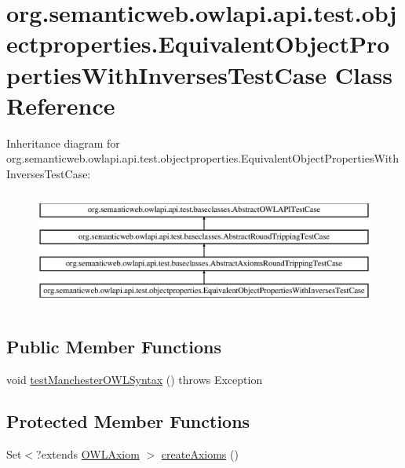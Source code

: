 \hypertarget{classorg_1_1semanticweb_1_1owlapi_1_1api_1_1test_1_1objectproperties_1_1_equivalent_object_properties_with_inverses_test_case}{\section{org.\-semanticweb.\-owlapi.\-api.\-test.\-objectproperties.\-Equivalent\-Object\-Properties\-With\-Inverses\-Test\-Case Class Reference}
\label{classorg_1_1semanticweb_1_1owlapi_1_1api_1_1test_1_1objectproperties_1_1_equivalent_object_properties_with_inverses_test_case}
}
Inheritance diagram for org.\-semanticweb.\-owlapi.\-api.\-test.\-objectproperties.\-Equivalent\-Object\-Properties\-With\-Inverses\-Test\-Case\-:\begin{figure}[H]
\begin{center}
\leavevmode
\includegraphics[height=3.895652cm]{classorg_1_1semanticweb_1_1owlapi_1_1api_1_1test_1_1objectproperties_1_1_equivalent_object_properties_with_inverses_test_case}
\end{center}
\end{figure}
\subsection*{Public Member Functions}
\begin{DoxyCompactItemize}
\item 
void \hyperlink{classorg_1_1semanticweb_1_1owlapi_1_1api_1_1test_1_1objectproperties_1_1_equivalent_object_properties_with_inverses_test_case_ab159b8f2fc0f4c717897d0c667ba51be}{test\-Manchester\-O\-W\-L\-Syntax} ()  throws Exception 
\end{DoxyCompactItemize}
\subsection*{Protected Member Functions}
\begin{DoxyCompactItemize}
\item 
Set$<$?extends \hyperlink{interfaceorg_1_1semanticweb_1_1owlapi_1_1model_1_1_o_w_l_axiom}{O\-W\-L\-Axiom} $>$ \hyperlink{classorg_1_1semanticweb_1_1owlapi_1_1api_1_1test_1_1objectproperties_1_1_equivalent_object_properties_with_inverses_test_case_abaaeb9ab8c28a19876b4e686edc3251a}{create\-Axioms} ()
\end{DoxyCompactItemize}


